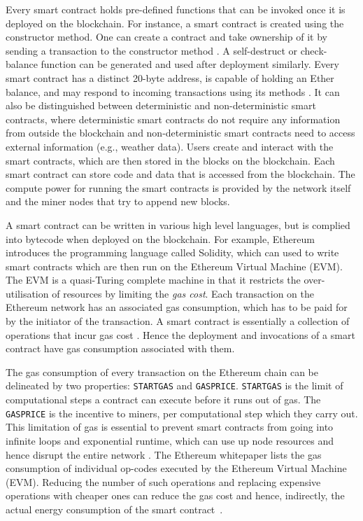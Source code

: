 \documentclass[10pt,conference]{IEEEtran}
\begin{document}
	Every smart contract holds pre-defined functions that can be invoked once it is deployed on the blockchain. For instance, a smart contract is created using the constructor method. One can create a contract and take ownership of it by sending a transaction to the constructor method \cite{wood2019ethereum, khanblockchain}. A self-destruct or check-balance function can be generated and used after deployment similarly. Every smart contract has a distinct 20-byte address, is capable of holding an Ether balance, and may respond to incoming transactions using its methods \cite{alharbyblockchain}. It can also be distinguished between deterministic and non-deterministic smart contracts, where deterministic smart contracts do not require any information from outside the blockchain and non-deterministic smart contracts need to access external information (e.g., weather data)\cite{morabito}. Users create and interact with the smart contracts, which are then stored in the blocks on the blockchain. Each smart contract can store code and data that is accessed from the blockchain. The compute power for running the smart contracts is provided by the network itself and the miner nodes that try to append new blocks.
	
	A smart contract can be written in various high level languages, but is complied into bytecode when deployed on the blockchain. For example, Ethereum introduces the programming language called Solidity, which can used to write smart contracts which are then run on the Ethereum Virtual Machine (EVM). The EVM is a quasi-Turing complete machine \cite{wood2019ethereum} in that it restricts the over-utilisation of resources by limiting the \textit{gas cost}. Each transaction on the Ethereum network has an associated gas consumption, which has to be paid for by the initiator of the transaction. A smart contract is essentially a collection of operations that incur gas cost \cite{wood2019ethereum}. Hence the deployment and invocations of a smart contract have gas consumption associated with them.
	
	The gas consumption of every transaction on the Ethereum chain can be delineated by two properties: \texttt{STARTGAS} and \texttt{GASPRICE}. \texttt{STARTGAS} is the limit of computational steps a contract can execute before it runs out of gas. The \texttt{GASPRICE} is the incentive to miners, per computational step which they carry out. This limitation of gas is essential to prevent smart contracts from going into infinite loops and exponential runtime, which can use up node resources and hence disrupt the entire network \cite{ethpaper}. The Ethereum whitepaper \cite{ethpaper} lists the gas consumption of individual op-codes executed by the Ethereum Virtual Machine (EVM). Reducing the number of such operations and replacing expensive operations with cheaper ones can reduce the gas cost and hence, indirectly, the actual energy consumption of the smart contract~\cite{contractenergyconsumptionthesis}.
	
\end{document}

